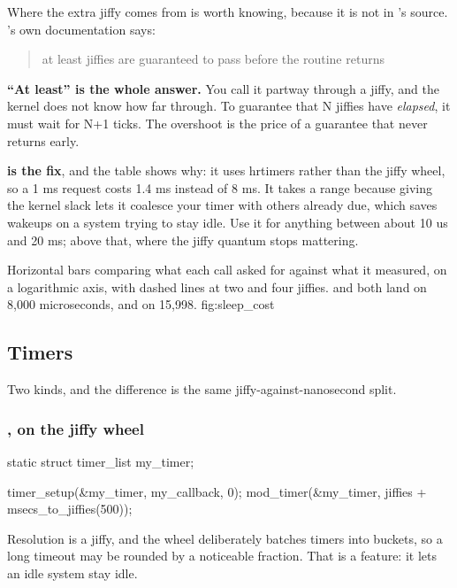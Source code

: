 \noindent Where the extra jiffy comes from is worth knowing, because it is not in 's
source. 's own documentation says:

\begin{quote}
at least  jiffies are guaranteed to pass before the routine returns
\end{quote}

\noindent\textbf{``At least'' is the whole answer.} You call it partway through a jiffy, and the kernel does
not know how far through. To guarantee that N jiffies have \emph{elapsed}, it must wait for N+1
ticks. The overshoot is the price of a guarantee that never returns early.

\textbf{ is the fix}, and the table shows why: it uses hrtimers rather than the
jiffy wheel, so a 1 ms request costs 1.4 ms instead of 8 ms. It takes a range because giving the
kernel slack lets it coalesce your timer with others already due, which saves wakeups on a system
trying to stay idle. Use it for anything between about 10 us and 20 ms;  above that,
where the jiffy quantum stops mattering.

  {Horizontal bars comparing what each call asked for against what it measured, on a logarithmic axis,
   with dashed lines at two and four jiffies.  and  both land on 8,000
   microseconds, and  on 15,998.}
  {fig:sleep_cost}

\subsection{Timers}
\label{c9:app:b5}

Two kinds, and the difference is the same jiffy-against-nanosecond split.

\subsubsection{, on the jiffy wheel}
\label{c9:app:b:timer_list-on-the-jiffy-wheel}

\begin{ccode}
static struct timer_list my_timer;

timer_setup(&my_timer, my_callback, 0);
mod_timer(&my_timer, jiffies + msecs_to_jiffies(500));
\end{ccode}

\noindent Resolution is a jiffy, and the wheel deliberately batches timers into buckets, so a long
timeout may be rounded by a noticeable fraction. That is a feature: it lets an idle system stay
idle.

